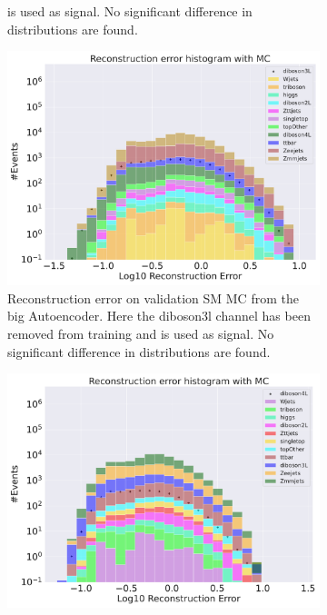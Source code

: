 \begin{figure}[h!]
\begin{subfigure}{.45\textwidth}
{        is used as signal. No significant difference in distributions are found. }
        \label{fig:vae_small_diboson3l}
    \end{subfigure}
    \hfill
    \begin{subfigure}{.45\textwidth}
        \includegraphics[width=\textwidth]{Figures/VAE_testing/big/b_data_recon_big_rm3_feats_sig_diboson3l.pdf}
        \caption{Reconstruction error on validation SM MC from the big Autoencoder. Here the diboson3l channel has been removed from training and 
        is used as signal. No significant difference in distributions are found. }
        \label{fig:vae_big_diboson3l}
    \end{subfigure}
    \hfill
    \begin{subfigure}{.45\textwidth}
        \includegraphics[width=\textwidth]{Figures/VAE_testing/small/b_data_recon_big_rm3_feats_sig_diboson4l.pdf}

\end{subfigure}
\end{figure}
